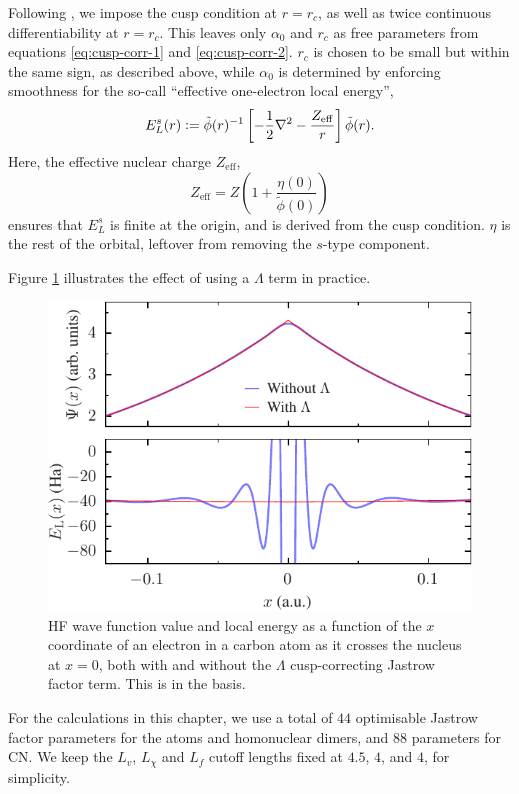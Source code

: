 Following , we impose the cusp condition at $r=r_c$, as well as twice continuous differentiability at $r=r_c$. This leaves only $\alpha_0$ and $r_c$ as free parameters from equations \ref{eq:cusp-corr-1} and \ref{eq:cusp-corr-2}. $r_c$ is chosen to be small but within the same sign, as described above, while $\alpha_0$ is determined by enforcing smoothness for the so-call ``effective one-electron local energy'',
\begin{equation}
    E_L^s(r) \mathrel{\mathop:}= \tilde\phi(r)^{-1}\left[-\frac 12\nabla^2-\frac{Z_{\mathrm{eff}}}r\right]\tilde\phi(r).
\end{equation}
Here, the effective nuclear charge $Z_\mathrm{eff}$,
\begin{equation}
    Z_\mathrm{eff} = Z\left(1 + \frac{\eta(0)}{\tilde\phi(0)}\right)
\end{equation}
ensures that $E_L^s$ is finite at the origin, and is derived from the cusp condition. $\eta$ is the rest of the orbital, leftover from removing the $s$-type component.

Figure \ref{fig:cusp-term} illustrates the effect of using a $\Lambda$
term in practice.

\begin{figure}[htbp]
    \centering
    \includegraphics[width=0.8\columnwidth]{figures/optimisation/Fig/cusp-term-eps-converted-to}
    \caption{\gls{HF} wave function value and local energy as a function of the $x$ coordinate of an electron in a carbon atom as it crosses the nucleus at $x=0$, both with and without the $\Lambda$ cusp-correcting Jastrow factor term. This is in the \vdz basis.}
    \label{fig:cusp-term}
\end{figure}

For the calculations in this chapter, we use a total of $44$ optimisable Jastrow factor parameters for the atoms and homonuclear dimers, and $88$ parameters for CN. We keep the $L_v$, $L_\chi$ and $L_f$ cutoff lengths fixed at $4.5$, $4$, and $4$, for simplicity.

